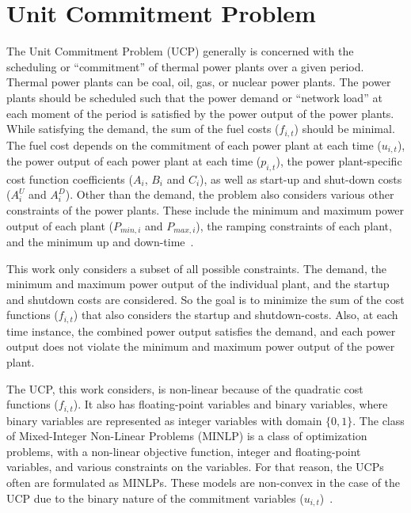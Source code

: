 \section{Unit Commitment Problem}
\label{fundamentals:ucp}

The Unit Commitment Problem (UCP) generally is concerned with the scheduling or ``commitment'' of thermal power plants over a given period.
Thermal power plants can be coal, oil, gas, or nuclear power plants.
The power plants should be scheduled such that the power demand or ``network load'' at each moment of the period is satisfied by the power output of the power plants.
While satisfying the demand, the sum of the fuel costs ($f_{i, t}$) should be minimal.
The fuel cost depends on the commitment of each power plant at each time ($u_{i, t}$), the power output of each power plant at each time ($p_{i, t}$), the power plant-specific cost function coefficients ($A_i$, $B_i$ and $C_i$), as well as start-up and shut-down costs ($A_{i}^{U}$ and $A_{i}^{D}$).
Other than the demand, the problem also considers various other constraints of the power plants.
These include the minimum and maximum power output of each plant ($P_{min, i}$ and $P_{max, i}$), the ramping constraints of each plant, and the minimum up and down-time~\cite{Baldick1995}.

This work only considers a subset of all possible constraints.
The demand, the minimum and maximum power output of the individual plant, and the startup and shutdown costs are considered.
So the goal is to minimize the sum of the cost functions ($f_{i, t}$) that also considers the startup and shutdown-costs.
Also, at each time instance, the combined power output satisfies the demand, and each power output does not violate the minimum and maximum power output of the power plant.

The UCP, this work considers, is non-linear because of the quadratic cost functions ($f_{i, t}$).
It also has floating-point variables and binary variables, where binary variables are represented as integer variables with domain $\{0, 1\}$.
The class of Mixed-Integer Non-Linear Problems (MINLP) is a class of optimization problems, with a non-linear objective function, integer and floating-point variables, and various constraints on the variables.
For that reason, the UCPs often are formulated as MINLPs.
These models are non-convex in the case of the UCP due to the binary nature of the commitment variables ($u_{i, t}$)~\cite{Baldick1995, Abujarad2017}.
